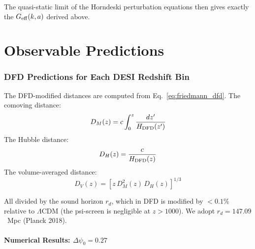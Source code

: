 \documentclass[11pt,a4paper]{article}
\newcommand{\LCDM}{$\Lambda$CDM}
\newcommand{\Geff}{G_{\rm eff}}
\begin{document}
The quasi-static limit of the Horndeski perturbation equations then
gives exactly the $\Geff(k,a)$ derived above.


\part{Observable Predictions}
\label{part:observables}

\section{DFD Predictions for Each DESI Redshift Bin}
\label{sec:observables}

\begin{tcolorbox}[colback=blue!3!white, colframe=blue!60!black,
  title=\textbf{Finding \thesection: Complete DFD Predictions for DESI
  DR2}\label{find:observables}]

The DFD-modified distances are computed from
Eq.~\eqref{eq:friedmann_dfd}. The comoving distance:
\begin{equation}
D_M(z) = c\int_0^z \frac{dz'}{H_{\rm DFD}(z')}
\end{equation}
The Hubble distance:
\begin{equation}
D_H(z) = \frac{c}{H_{\rm DFD}(z)}
\end{equation}
The volume-averaged distance:
\begin{equation}
D_V(z) = \left[z\,D_M^2(z)\,D_H(z)\right]^{1/3}
\end{equation}

All divided by the sound horizon $r_d$, which in DFD is modified by
$<0.1\%$ relative to \LCDM{} (the psi-screen is negligible at
$z > 1000$). We adopt $r_d = 147.09$~Mpc (Planck 2018).

\end{tcolorbox}

\subsection{Numerical Results: $\Delta\psi_0 = 0.27$}
\end{document}
